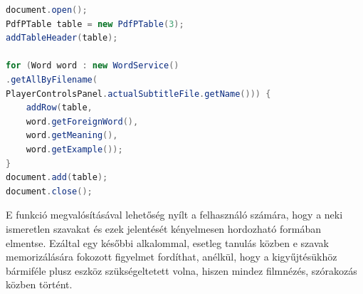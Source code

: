 \begin{lstlisting}[caption=PDF fájl megalkotása, language=java, label={lst:pdf}]
document.open();
PdfPTable table = new PdfPTable(3);
addTableHeader(table);

for (Word word : new WordService()
.getAllByFilename(
PlayerControlsPanel.actualSubtitleFile.getName())) {
    addRow(table,
    word.getForeignWord(),
    word.getMeaning(),
    word.getExample());
}
document.add(table);
document.close();
\end{lstlisting}

E funkció megvalósításával lehetőség nyílt a felhasználó számára, hogy a neki ismeretlen szavakat és ezek jelentését kényelmesen hordozható formában elmentse. Ezáltal egy későbbi alkalommal, esetleg tanulás közben e szavak memorizálására fokozott figyelmet fordíthat, anélkül, hogy a kigyűjtésükhöz bármiféle plusz eszköz szükségeltetett volna, hiszen mindez filmnézés, szórakozás közben történt.